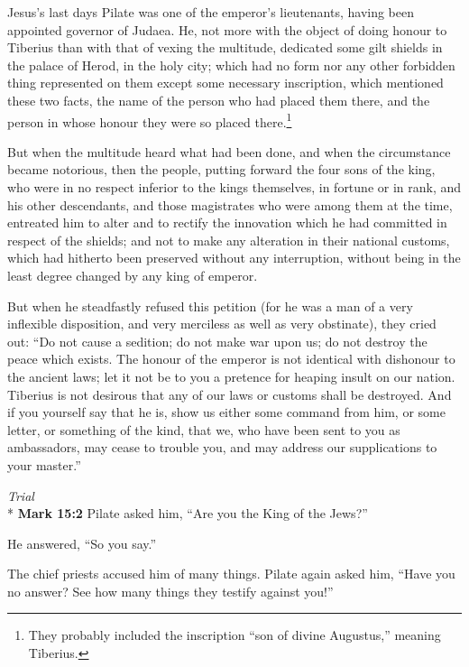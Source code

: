\documentclass[10pt,a5paper,twoside]{article}
\newcommand{\quotesize}{\normalsize{}}
\newenvironment{quotetext}{\begingroup\quotesize}{\endgroup}
\newcommand{\intex}[1]{\index[texts]{#1}}
\newcommand{\bible}[2]{\begin{quotetext}\textbf{#1}\intex{#1} #2\end{quotetext}}
\newcommand{\gospelmark}[2]{\bible{Mark #1}{#2}}
\newcommand{\subhead}[1]{\emph{#1}\\*}
\begin{document}
\begin{section}{Jesus's last days}
\begin{quotetext}
Pilate was one of the emperor's lieutenants, having been appointed
governor of Judaea. He, not more with the object of doing honour to
Tiberius than with that of vexing the multitude, dedicated some gilt
shields in the palace of Herod, in the holy city; which had no form
nor any other forbidden thing represented on them except some
necessary inscription, which mentioned these two facts, the name of
the person who had placed them there, and the person in whose honour
they were so placed there.\footnote{They probably included the inscription ``son of divine Augustus,'' meaning Tiberius.} 

But when the multitude heard what had been
done, and when the circumstance became notorious, then the people,
putting forward the four sons of the king, who were in no respect
inferior to the kings themselves, in fortune or in rank, and his other
descendants, and those magistrates who were among them at the time,
entreated him to alter and to rectify the innovation which he had
committed in respect of the shields; and not to make any alteration in
their national customs, which had hitherto been preserved without any
interruption, without being in the least degree changed by any king of
emperor.

But when he steadfastly refused this petition (for he was a
man of a very inflexible disposition, and very merciless as well as
very obstinate), they cried out: ``Do not cause a sedition; do not make
war upon us; do not destroy the peace which exists. The honour of the
emperor is not identical with dishonour to the ancient laws; let it
not be to you a pretence for heaping insult on our nation. Tiberius is
not desirous that any of our laws or customs shall be destroyed. And
if you yourself say that he is, show us either some command from him,
or some letter, or something of the kind, that we, who have been sent
to you as ambassadors, may cease to trouble you, and may address our
supplications to your master.''
\end{quotetext}


\subhead{Trial}
\gospelmark{15:2}{
Pilate asked him, ``Are you the King of the Jews?''

He answered, ``So you say.''

  The chief priests accused him of many things.   Pilate again asked him, ``Have you no answer? See how many things they testify against you!''

}
\end{section}
\end{document}
